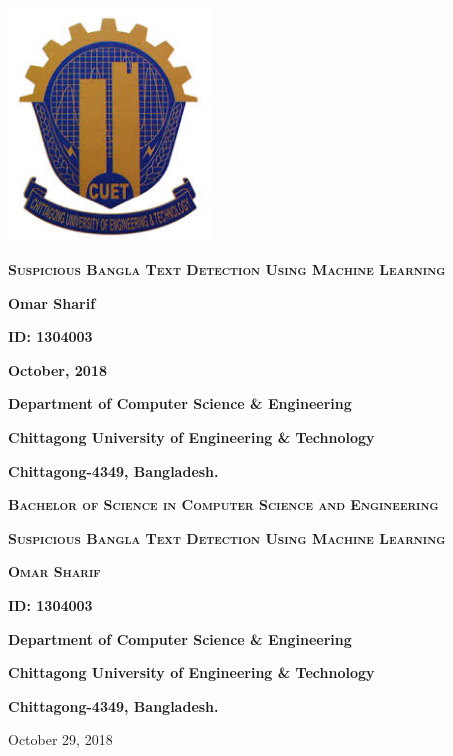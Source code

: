 \begin{titlepage}
	\centering
	\includegraphics[width=0.4\textwidth]{Figures/Logo.jpeg}\par\vspace{1cm}
	\vspace{1cm}
		{\scshape\Large\bfseries Suspicious Bangla Text Detection Using Machine Learning  \par}
	\vspace{2cm}
	 
	\textbf{Omar Sharif}\par 
	\vspace{.5cm}
	\textbf{ID: 1304003}\par 
	\vspace{3cm}
	\textbf{October, 2018}
	
	\vspace{4cm}
	{\Large\bfseries Department of Computer Science \& Engineering\par}
	{\large\bfseries Chittagong University of Engineering \& Technology\par}
	{\bfseries Chittagong-4349, Bangladesh.}

	\vfill
\end{titlepage}

\begin{titlepage}
	\centering
	{\scshape\LARGE\bfseries Bachelor of Science in Computer Science and Engineering \par}
	\vspace{7cm}
	{\scshape\Large\bfseries Suspicious Bangla Text Detection Using Machine Learning \par}
	\vspace{3cm}
	{\scshape\bfseries Omar Sharif\par}
	{\scshape\bfseries ID: 1304003\par}
	
	\vspace{8cm}
	{\bfseries Department of Computer Science \& Engineering\par}
	{\bfseries Chittagong University of Engineering \& Technology\par}
	{\bfseries Chittagong-4349, Bangladesh.}

	\vfill

	{\large October 29, 2018\par}
\end{titlepage}

